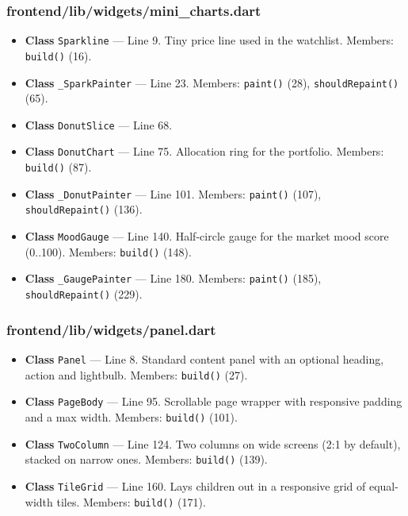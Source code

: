 \subsubsection*{frontend/lib/widgets/mini\_charts.dart}
\begin{itemize}[nosep,leftmargin=1.5em]
\item \textbf{Class} \texttt{Sparkline} --- Line 9. Tiny price line used in the watchlist. Members: \texttt{build(\allowbreak{})} (16).
\item \textbf{Class} \texttt{\_\allowbreak{}SparkPainter} --- Line 23. Members: \texttt{paint(\allowbreak{})} (28), \texttt{shouldRepaint(\allowbreak{})} (65).
\item \textbf{Class} \texttt{DonutSlice} --- Line 68.
\item \textbf{Class} \texttt{DonutChart} --- Line 75. Allocation ring for the portfolio. Members: \texttt{build(\allowbreak{})} (87).
\item \textbf{Class} \texttt{\_\allowbreak{}DonutPainter} --- Line 101. Members: \texttt{paint(\allowbreak{})} (107), \texttt{shouldRepaint(\allowbreak{})} (136).
\item \textbf{Class} \texttt{MoodGauge} --- Line 140. Half-circle gauge for the market mood score (0..100). Members: \texttt{build(\allowbreak{})} (148).
\item \textbf{Class} \texttt{\_\allowbreak{}GaugePainter} --- Line 180. Members: \texttt{paint(\allowbreak{})} (185), \texttt{shouldRepaint(\allowbreak{})} (229).
\end{itemize}
\subsubsection*{frontend/lib/widgets/panel.dart}
\begin{itemize}[nosep,leftmargin=1.5em]
\item \textbf{Class} \texttt{Panel} --- Line 8. Standard content panel with an optional heading, action and lightbulb. Members: \texttt{build(\allowbreak{})} (27).
\item \textbf{Class} \texttt{PageBody} --- Line 95. Scrollable page wrapper with responsive padding and a max width. Members: \texttt{build(\allowbreak{})} (101).
\item \textbf{Class} \texttt{TwoColumn} --- Line 124. Two columns on wide screens (2:1 by default), stacked on narrow ones. Members: \texttt{build(\allowbreak{})} (139).
\item \textbf{Class} \texttt{TileGrid} --- Line 160. Lays children out in a responsive grid of equal-width tiles. Members: \texttt{build(\allowbreak{})} (171).
\end{itemize}
